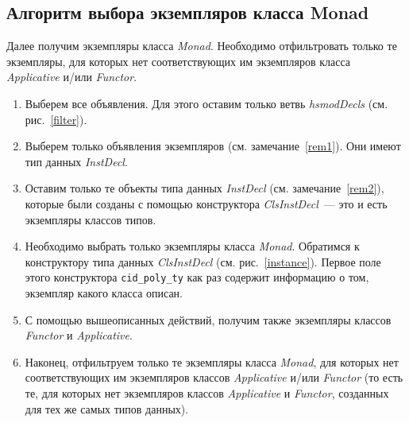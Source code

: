 \subsection{Алгоритм выбора экземпляров класса Monad}\label{filtermonad}
Далее получим экземпляры класса \textit{Monad}. Необходимо отфильтровать только те экземпляры, для которых нет соответствующих им экземпляров класса \textit{Applicative}  и/или \textit{Functor}.
\begin{enumerate}
\item Выберем все объявления. Для этого оставим только ветвь \textit{hsmodDecls} (см. рис.~\ref{filter}).
\item Выберем только объявления экземпляров (см. замечание~\ref{rem1}). Они имеют тип данных \textit{InstDecl}.
\item Оставим только те объекты типа данных \textit{InstDecl} (см. замечание~\ref{rem2}), которые были созданы с помощью конструктора \textit{ClsInstDecl}~--- это и есть экземпляры классов типов.
\item Необходимо выбрать только экземпляры класса \textit{Monad}. Обратимся к конструктору типа данных \textit{ClsInstDecl} (см. рис.~\ref{instance}). Первое поле этого конструктора \lstinline{cid_poly_ty} как раз содержит информацию о том, экземпляр какого класса описан. 
\item С помощью вышеописанных действий, получим также экземпляры классов \textit{Functor} и \textit{Applicative}.
\item Наконец, отфильтруем только те экземпляры класса \textit{Monad}, для которых нет соответствующих им экземпляров классов \textit{Applicative} и/или \textit{Functor} (то есть те, для которых нет экземпляров классов \textit{Applicative} и \textit{Functor}, созданных для тех же самых типов данных).
\end{enumerate}

\label{rem1}

